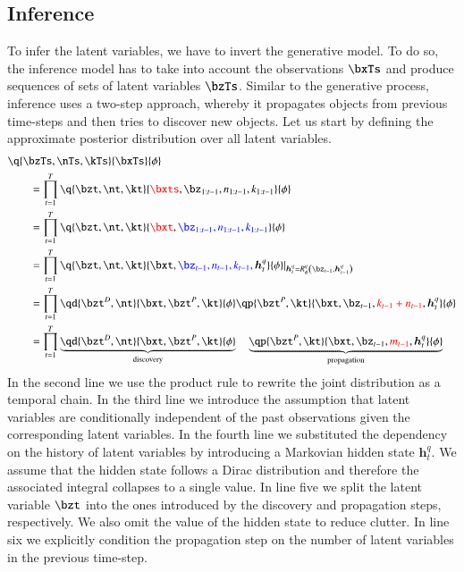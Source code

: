 \subsection{Inference}
To infer the latent variables, we have to invert the generative model. To do so, the inference model has to take into account the observations $\bxTs$ and produce sequences of sets of latent variables $\bzTs$. Similar to the generative process, inference uses a two-step approach, whereby it propagates objects from previous time-steps and then tries to discover new objects. Let us start by defining the approximate posterior distribution over all latent variables.
\begin{equation}
\begin{aligned}
    &\q{\bzTs, \nTs, \kTs}{\bxTs}{\phi} \\
%    
    &\qquad= \prod_{t=1}^T  \q{\bzt, \nt, \kt}{\textcolor{red}{\bxts}, \bz_{1:t-1}, n_{1:t-1}, k_{1:t-1}}{\phi}\\
%    
    &\qquad= \prod_{t=1}^T  \q{\bzt, \nt, \kt}{\textcolor{red}{\bxt}, \textcolor{blue}{\bz_{1:t-1}, n_{1:t-1}, k_{1:t-1}}}{\phi}\\
%    
    &\qquad= \prod_{t=1}^T  \q{\bzt, \nt, \kt}{\bxt, \textcolor{blue}{\bz_{t-1}, n_{t-1}, k_{t-1}}, \bm{h}_t^q}{\phi}\lvert_{\bm{h}_t^q = R^q_\phi \left( \bz_{t-1}, \bm{h}_{t-1}^q \right)} \\
%    
    &\qquad= \prod_{t=1}^T  \qd{\bzt^D, \nt}{\bxt, \bzt^P, \kt}{\phi} \qp{\bzt^P, \kt}{\bxt, \bz_{t-1}, \textcolor{red}{k_{t-1} + n_{t-1}}, \bm{h}_t^q}{\phi} \\
%    
    &\qquad= \prod_{t=1}^T  \underbrace{ \qd{\bzt^D, \nt}{\bxt, \bzt^P, \kt}{\phi}}_\mathrm{discovery} \quad \underbrace{\qp{\bzt^P, \kt}{\bxt, \bz_{t-1}, \textcolor{red}{m_{t-1}}, \bm{h}_t^q}{\phi}}_\mathrm{propagation} 
\end{aligned}
\end{equation}
In the second line we use the product rule to rewrite the joint distribution as a temporal chain. In the third line we introduce the assumption that latent variables are conditionally independent of the past observations given the corresponding latent variables. In the fourth line we substituted the dependency on the history of latent variables by introducing a Markovian hidden state $\bm{h}_t^q$. We assume that the hidden state follows a Dirac distribution and therefore the associated integral collapses to a single value. In line five we split the latent variable $\bzt$ into the ones introduced by the discovery and propagation steps, respectively. We also omit the value of the hidden state to reduce clutter. In line six we explicitly condition the propagation step on the number of latent variables in the previous time-step.

